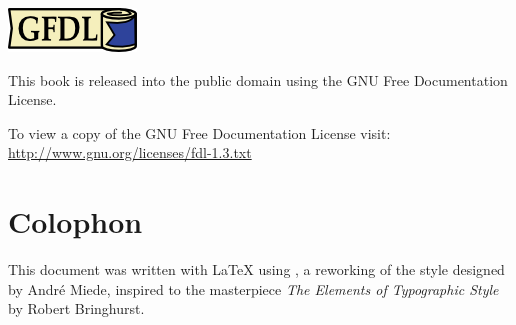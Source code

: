 \pagestyle{empty}

\hfill

\vfill


\includegraphics[scale=1]{front/gfdl-logo-small.png}

This book is released into the public domain using the GNU Free Documentation License. 
	
To view a copy of the GNU Free Documentation License visit: \\\url{http://www.gnu.org/licenses/fdl-1.3.txt}
\section*{Colophon}
This document was written with \LaTeX{} using \arsclassica, a reworking of the \classicthesis{} style designed by Andr\'e Miede, inspired to the masterpiece \emph{The Elements of Typographic Style} by Robert Bringhurst.
